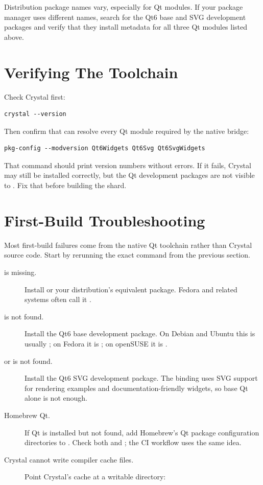 Distribution package names vary, especially for Qt modules. If your package manager uses different names, search for the Qt6 base and SVG development packages and verify that they install  metadata for all three Qt modules listed above.

\section{Verifying The Toolchain}

Check Crystal first:

\begin{lstlisting}[style=crystal]
crystal --version
\end{lstlisting}

Then confirm that  can resolve every Qt module required by the native bridge:

\begin{lstlisting}[style=crystal]
pkg-config --modversion Qt6Widgets Qt6Svg Qt6SvgWidgets
\end{lstlisting}

That command should print version numbers without errors. If it fails, Crystal may still be installed correctly, but the Qt development packages are not visible to . Fix that before building the shard.

\section{First-Build Troubleshooting}

Most first-build failures come from the native Qt toolchain rather than Crystal source code. Start by rerunning the exact  command from the previous section.

\begin{description}
\item[ is missing.] Install  or your distribution's equivalent package. Fedora and related systems often call it .
\item[ is not found.] Install the Qt6 base development package. On Debian and Ubuntu this is usually ; on Fedora it is ; on openSUSE it is .
\item[ or  is not found.] Install the Qt6 SVG development package. The binding uses SVG support for rendering examples and documentation-friendly widgets, so base Qt alone is not enough.
\item[Homebrew Qt.] If Qt is installed but not found, add Homebrew's Qt package configuration directories to . Check both  and ; the CI workflow uses the same idea.
\item[Crystal cannot write compiler cache files.] Point Crystal's cache at a writable directory:
\end{description}

